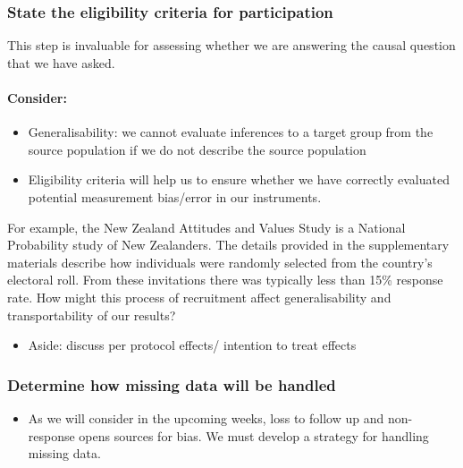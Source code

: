 \documentclass[
  singlecolumn]{article}
\let\oldparagraph\paragraph
\renewcommand{\paragraph}[1]{\oldparagraph{#1}\mbox{}}
\providecommand{\tightlist}{%
  \setlength{\itemsep}{0pt}\setlength{\parskip}{0pt}}\usepackage{longtable,booktabs,array}
\begin{document}
\subsubsection{State the eligibility criteria for
participation}\label{state-the-eligibility-criteria-for-participation}

This step is invaluable for assessing whether we are answering the
causal question that we have asked.

\paragraph{Consider:}\label{consider-1}

\begin{itemize}
\tightlist
\item
  Generalisability: we cannot evaluate inferences to a target group from
  the source population if we do not describe the source population
\item
  Eligibility criteria will help us to ensure whether we have correctly
  evaluated potential measurement bias/error in our instruments.
\end{itemize}

For example, the New Zealand Attitudes and Values Study is a National
Probability study of New Zealanders. The details provided in the
supplementary materials describe how individuals were randomly selected
from the country's electoral roll. From these invitations there was
typically less than 15\% response rate. How might this process of
recruitment affect generalisability and transportability of our results?

\begin{itemize}
\tightlist
\item
  Aside: discuss per protocol effects/ intention to treat effects
\end{itemize}

\subsubsection{Determine how missing data will be
handled}\label{determine-how-missing-data-will-be-handled}

\begin{itemize}
\tightlist
\item
  As we will consider in the upcoming weeks, loss to follow up and
  non-response opens sources for bias. We must develop a strategy for
  handling missing data.
\end{itemize}
\end{document}
